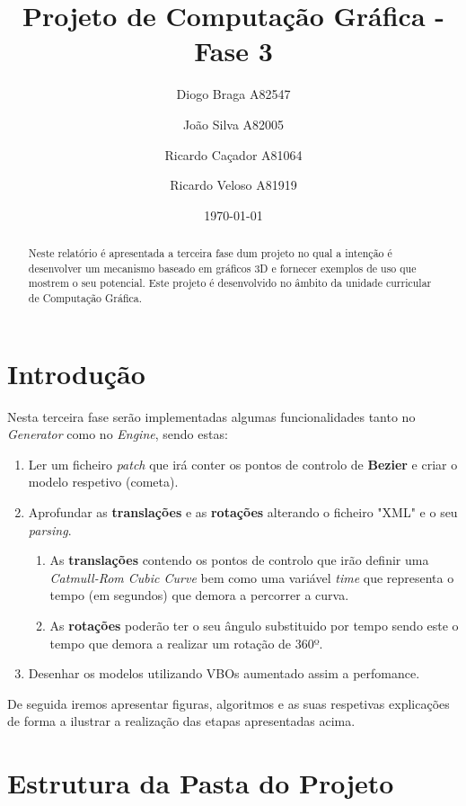 \documentclass[a4paper]{article}
\title{Projeto de Computação Gráfica - Fase 3}
\author{Diogo Braga A82547 \and João Silva A82005 \and Ricardo Caçador A81064
\and Ricardo Veloso A81919}
\date{\today}
\begin{document}
\maketitle

\begin{abstract}
Neste relatório é apresentada a terceira fase dum projeto no qual a intenção é desenvolver um mecanismo baseado em gráficos 3D e fornecer exemplos de uso que mostrem o seu potencial. Este projeto é desenvolvido no âmbito da unidade curricular de Computação Gráfica.
\end{abstract}


\newpage

\tableofcontents


\newpage

\section{Introdução}
\label{sec:intro}

Nesta terceira fase serão implementadas algumas funcionalidades tanto no \textit{Generator} como no \textit{Engine}, sendo estas:

\begin{enumerate}
\item Ler um ficheiro \textit{patch} que irá conter os pontos de controlo de \textbf{Bezier} e criar o modelo respetivo (cometa).
\item Aprofundar as \textbf{translações} e as \textbf{rotações} alterando o ficheiro "XML" e o seu \textit{parsing}.
  \begin{enumerate}
  \item As \textbf{translações} contendo os pontos de controlo que irão definir uma \textit{Catmull-Rom Cubic Curve} bem como uma variável \textit{time} que representa o tempo (em segundos) que demora a percorrer a curva.
  \item As \textbf{rotações} poderão ter o seu ângulo substituido por tempo sendo este o tempo que demora a realizar um rotação de 360º.
  \end{enumerate}
\item Desenhar os modelos utilizando VBOs aumentado assim a perfomance.
\end{enumerate}

De seguida iremos apresentar figuras, algoritmos e as suas respetivas explicações de forma a ilustrar a realização das etapas apresentadas acima.

\newpage

\section{Estrutura da Pasta do Projeto}
\label{sec:estrutura}
\end{document}

